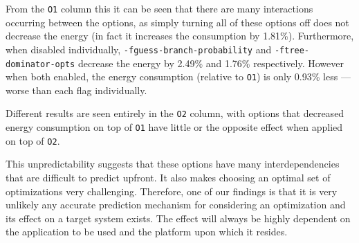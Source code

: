 \documentclass[twocolumn]{article}
\begin{document}
From the \texttt{O1} column this it can be seen that there are many interactions occurring between the options, as simply turning all of these options off does not decrease the energy (in fact it increases the consumption by 1.81\%). Furthermore, when disabled individually, \texttt{-fguess-branch-probability} and \texttt{-ftree-dominator-opts} decrease the energy by 2.49\% and 1.76\% respectively. However when both enabled, the energy consumption (relative to \texttt{O1}) is only 0.93\% less --- worse than each flag individually.

Different results are seen entirely in the \texttt{O2} column, with options that decreased energy consumption on top of \texttt{O1} have little or the opposite effect when applied on top of \texttt{O2}.

This unpredictability suggests that these options have many interdependencies that are difficult to predict upfront. It also makes choosing an optimal set of optimizations very challenging. Therefore, one of our findings is that it is very unlikely any accurate prediction mechanism for considering an optimization and its effect on a target system exists. The effect will always be highly dependent on the application to be used and the platform upon which it resides.
\end{document}
